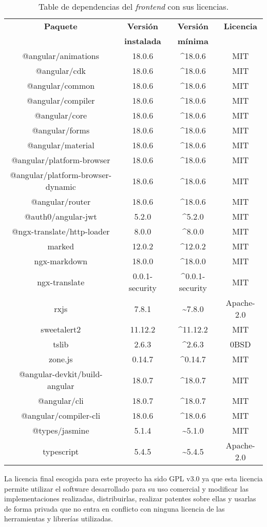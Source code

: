 \begin{table}
	\centering
	\begin{tabular}{|c|c|c|c|}
		\hline
		\textbf{Paquete} & \textbf{Versión} & \textbf{Versión} & \textbf{Licencia} \\
		~ & \textbf{instalada} & \textbf{mínima} &~ \\
			\hline
		@angular/animations & 18.0.6 & \^{}18.0.6 & MIT \\
		\hline
		@angular/cdk & 18.0.6 & \^{}18.0.6 & MIT \\
		\hline
		@angular/common & 18.0.6 & \^{}18.0.6 & MIT \\
		\hline
		@angular/compiler & 18.0.6 & \^{}18.0.6 & MIT \\
		\hline
		@angular/core & 18.0.6 & \^{}18.0.6 & MIT \\
		\hline
		@angular/forms & 18.0.6 & \^{}18.0.6 & MIT \\
		\hline
		@angular/material & 18.0.6 & \^{}18.0.6 & MIT \\
		\hline
		@angular/platform-browser & 18.0.6 & \^{}18.0.6 & MIT \\
		\hline
		@angular/platform-browser-dynamic & 18.0.6 & \^{}18.0.6 & MIT \\
		\hline
		@angular/router & 18.0.6 & \^{}18.0.6 & MIT \\
		\hline
		@auth0/angular-jwt & 5.2.0 & \^{}5.2.0 & MIT \\
		\hline
		@ngx-translate/http-loader & 8.0.0 & \^{}8.0.0 & MIT \\
		\hline
		marked & 12.0.2 & \^{}12.0.2 & MIT \\
		\hline
		ngx-markdown & 18.0.0 & \^{}18.0.0 & MIT \\
		\hline
		ngx-translate & 0.0.1-security & \^{}0.0.1-security & MIT \\
		\hline
		rxjs & 7.8.1 & \~{}7.8.0 & Apache-2.0 \\
		\hline
		sweetalert2 & 11.12.2 & \^{}11.12.2 & MIT \\
		\hline
		tslib & 2.6.3 & \^{}2.6.3 & 0BSD \\
		\hline
		zone.js & 0.14.7 & \^{}0.14.7 & MIT \\
		\hline
		@angular-devkit/build-angular & 18.0.7 & \^{}18.0.7 & MIT \\
		\hline
		@angular/cli & 18.0.7 & \^{}18.0.7 & MIT \\
		\hline
		@angular/compiler-cli & 18.0.6 & \^{}18.0.6 & MIT \\
		\hline
		@types/jasmine & 5.1.4 & \~{}5.1.0 & MIT \\
		\hline
		typescript & 5.4.5 & \~{}5.4.5 & Apache-2.0 \\
		\hline
	\end{tabular}
	\caption{Table de dependencias del \textit{frontend} con sus licencias.}
	\label{deps:fonts}
\end{table}
La licencia final escogida para este proyecto ha sido GPL v3.0 ya que esta licencia permite utilizar el software desarrollado para su uso comercial y modificar las implementaciones realizadas, distribuirlas, realizar patentes sobre ellas y usarlas de forma privada que no entra en conflicto con ninguna licencia de las herramientas y librerías utilizadas.
